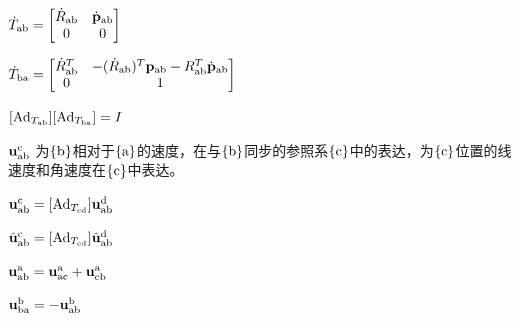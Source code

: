 \documentclass[12pt, a4paper, article, UTF8]{ctexart}
\begin{document}
\begin{mytheorem}
$\dot{T}_\textnormal{ab}  = \begin{bmatrix}
\dot{R}_\textnormal{ab} & \dot{\mathbf{p}}_\textnormal{ab}\\
0 & 0
\end{bmatrix} $ \label{th:dotTab}
\end{mytheorem}

\begin{mytheorem}
$\dot{T}_\textnormal{ba}  = \begin{bmatrix}
\dot{R}_\textnormal{ab}^T & -(\dot{R}_\textnormal{ab})^T \mathbf{p}_\textnormal{ab} - R_\textnormal{ab}^T \dot{\mathbf{p}}_\textnormal{ab} \\
0 & 1
\end{bmatrix} $ \label{th:dotTba}
\end{mytheorem}

\begin{mytheorem}
$[\textnormal{Ad}_{T_\textnormal{ab}}][\textnormal{Ad}_{T_\textnormal{ba}}] = I $
\end{mytheorem}

\begin{mytheorem}
$\mathbf{u}_\textnormal{ab}^\textnormal{c} $ 为$\{\textnormal{b}\}$相对于$\{\textnormal{a}\}$的速度，在与$\{\textnormal{b}\}$同步的参照系$\{\textnormal{c}\}$中的表达，为$\{\textnormal{c}\}$位置的线速度和角速度在$\{\textnormal{c}\}$中表达。\label{th:twistmeaning}
\end{mytheorem}

\begin{mytheorem}
$\mathbf{u}_\textnormal{ab}^\textnormal{c} = [\textnormal{Ad}_{T_\textnormal{cd}}]\mathbf{u}_\textnormal{ab}^\textnormal{d} $ \label{th:twistchangeframe}
\end{mytheorem}

\begin{mytheorem}
$\hat{\mathbf{u}}_\textnormal{ab}^\textnormal{c} = [\textnormal{Ad}_{T_\textnormal{cd}}]\hat{\mathbf{u}}_\textnormal{ab}^\textnormal{d} $
\end{mytheorem}

\begin{mytheorem}
$\mathbf{u}_\textnormal{ab}^\textnormal{a} = \mathbf{u}_\textnormal{ac}^\textnormal{a} + \mathbf{u}_\textnormal{cb}^\textnormal{a} $ \label{th:relativityoftwist}
\end{mytheorem}

\begin{mytheorem}
$\mathbf{u}_\textnormal{ba}^\textnormal{b} = -\mathbf{u}_\textnormal{ab}^\textnormal{b} $ \label{th:reversetwist}
\end{mytheorem}
\end{document}
